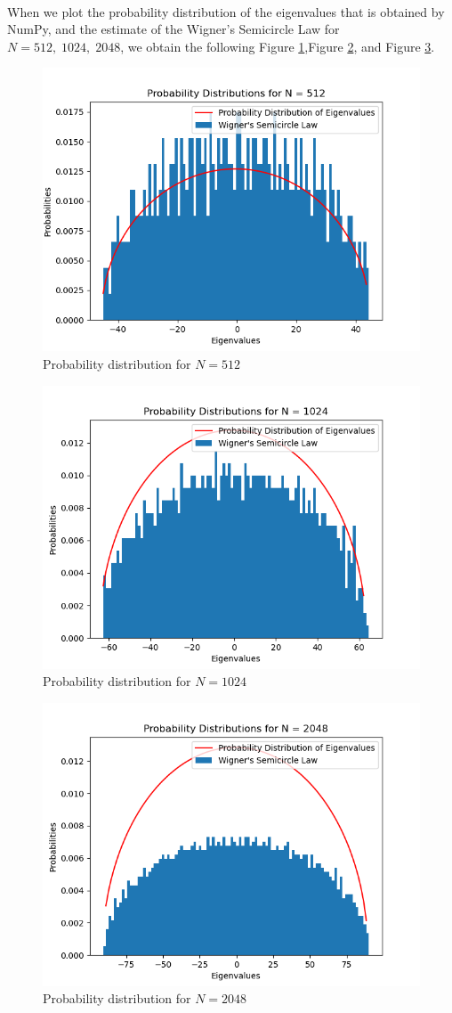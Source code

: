 \documentclass[letterpaper,12pt]{article}
\begin{document}
\paragraph{} When we plot the probability distribution of the eigenvalues that is obtained by NumPy, and the estimate of the Wigner's Semicircle Law for $N = 512, \;1024, \; 2048$, we obtain the following Figure \ref{fig:n512},Figure \ref{fig:n1024}, and Figure \ref{fig:n2048}.

\begin{figure}[H] 
   \centering \includegraphics[width=0.7\columnwidth]{figures/n512.png}           
                  \caption{Probability distribution for $N=512$}                
                     \label{fig:n512}
   \end{figure}

\begin{figure}[H] 
   \centering \includegraphics[width=0.7\columnwidth]{figures/n1024.png}           
                  \caption{Probability distribution for $N=1024$}                
                     \label{fig:n1024}
   \end{figure}

\begin{figure}[H] 
   \centering \includegraphics[width=0.7\columnwidth]{figures/n2048.png}           
                  \caption{Probability distribution for $N=2048$}                
                     \label{fig:n2048}
   \end{figure}
\end{document}
